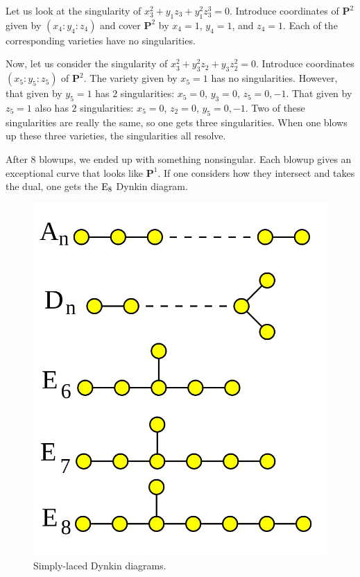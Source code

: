 \documentclass [11 pt, oneside, margin = 1 in] {article}
\begin{document}
\begin{example}
Let us look at the singularity of $x_3^2+y_1z_3+y_1^2z_3^3 =0 $. Introduce coordinates of $\mathbf{P}^2$ given by $(x_4:y_4:z_4)$ and cover $\mathbf{P}^2$ by $x_4=1$, $y_4=1$, and $z_4=1$. Each of the corresponding varieties have no singularities.

Now, let us consider the singularity of $x_3^2+y_3^2z_2+y_3z_2^2 =0$. Introduce coordinates $(x_5:y_5:z_5)$ of $\mathbf{P}^2$. The variety given by $x_5=1$ has no singularities. However, that given by $y_5=1$ has $2$ singularities: $x_5=0$, $y_3=0$, $z_5=0,-1$. That given by $z_5=1$ also has $2$ singularities: $x_5=0$, $z_2=0$, $y_5=0,-1$. Two of these singularities are really the same, so one gets three singularities. 
When one blows up these three varieties, the singularities all resolve.
\end{example} 

After $8$ blowups, we ended up with something nonsingular. Each blowup gives an exceptional curve that looks like $\mathbf{P}^1$. If one considers how they intersect and takes the dual, one gets the $\operatorname{E}_8$ Dynkin diagram. 

\begin{figure}
	\begin{center}
		\includegraphics[scale=0.3]{images/simply_laced}
		\caption{Simply-laced Dynkin diagrams.}
	\end{center}
\end{figure}
\end{document}
